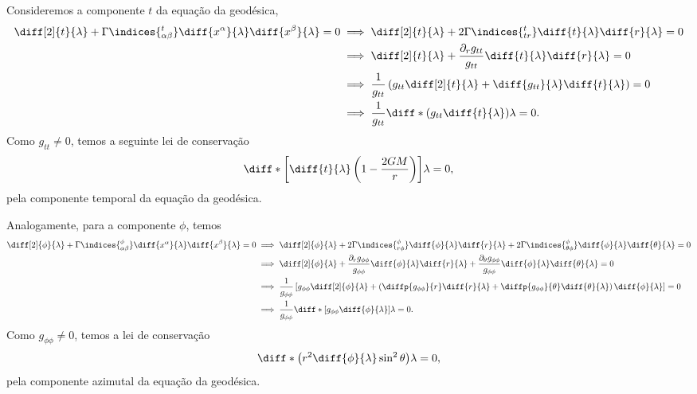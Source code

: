 Consideremos a componente \(t\) da equação da geodésica,
\begin{align*}
    \diff[2]{t}{\lambda} + \Gamma\indices{^t_{\alpha \beta}} \diff{x^\alpha}{\lambda}\diff{x^\beta}{\lambda} = 0
    &\implies \diff[2]{t}{\lambda} + 2 \Gamma\indices{^t_{tr}} \diff{t}{\lambda}\diff{r}{\lambda} = 0\\
    &\implies \diff[2]{t}{\lambda} + \frac{\partial_r g_{tt}}{g_{tt}} \diff{t}{\lambda}\diff{r}{\lambda} = 0\\
    &\implies \frac{1}{g_{tt}}\left(g_{tt}\diff[2]{t}{\lambda} + \diff{g_{tt}}{\lambda} \diff{t}{\lambda}\right) = 0\\
    &\implies \frac{1}{g_{tt}} \diff*{\left(g_{tt}\diff{t}{\lambda}\right)}{\lambda} = 0.
\end{align*}
Como \(g_{tt} \neq 0\), temos a seguinte lei de conservação
\begin{equation*}
    \diff*{\left[\diff{t}{\lambda}\left(1 - \frac{2GM}{r}\right)\right]}{\lambda} = 0,
\end{equation*}
pela componente temporal da equação da geodésica.

Analogamente, para a componente \(\phi\), temos
\begin{align*}
    \diff[2]{\phi}{\lambda} + \Gamma\indices{^\phi_{\alpha \beta}} \diff{x^\alpha}{\lambda}\diff{x^\beta}{\lambda} = 0
    &\implies \diff[2]{\phi}{\lambda} + 2 \Gamma\indices{^\phi_{r\phi}} \diff{\phi}{\lambda}\diff{r}{\lambda} + 2 \Gamma\indices{^\phi_{\theta\phi}} \diff{\phi}{\lambda} \diff{\theta}{\lambda}= 0\\
    &\implies \diff[2]{\phi}{\lambda} + \frac{\partial_r g_{\phi\phi}}{g_{\phi\phi}} \diff{\phi}{\lambda}\diff{r}{\lambda} + \frac{\partial_\theta g_{\phi\phi}}{g_{\phi\phi}} \diff{\phi}{\lambda}\diff{\theta}{\lambda}= 0\\
    &\implies \frac1{g_{\phi\phi}}\left[g_{\phi\phi}\diff[2]{\phi}{\lambda} + \left(\diffp{g_{\phi\phi}}{r}\diff{r}{\lambda} + \diffp{g_{\phi\phi}}{\theta}\diff{\theta}{\lambda}\right)\diff{\phi}{\lambda}\right] = 0\\
    &\implies \frac{1}{g_{\phi\phi}}\diff*{\left[g_{\phi\phi}\diff{\phi}{\lambda}\right]}{\lambda} = 0.
\end{align*}
Como \(g_{\phi\phi} \neq 0\), temos a lei de conservação
\begin{equation*}
    \diff*{\left(r^2 \diff{\phi}{\lambda}\sin^2\theta\right)}{\lambda} = 0,
\end{equation*}
pela componente azimutal da equação da geodésica.


